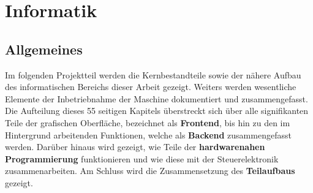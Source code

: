 \chapter{Informatik}\label{ch:informatik}
\section{Allgemeines}\label{sec:einleitung}
Im folgenden Projektteil werden die Kernbestandteile sowie der nähere Aufbau des informatischen Bereichs dieser Arbeit gezeigt.
Weiters werden wesentliche Elemente der Inbetriebnahme der Maschine dokumentiert und zusammengefasst.
Die Aufteilung dieses 55 seitigen Kapitels überstreckt sich über alle signifikanten Teile der grafischen Oberfläche, bezeichnet als \textbf{Frontend}, bis hin zu den im Hintergrund arbeitenden Funktionen, welche als \textbf{Backend} zusammengefasst werden.
Darüber hinaus wird gezeigt, wie Teile der \textbf{hardwarenahen Programmierung} funktionieren und wie diese mit der Steuerelektronik zusammenarbeiten.
Am Schluss wird die Zusammensetzung des \textbf{Teilaufbaus} gezeigt.

